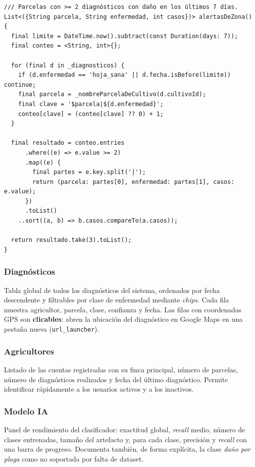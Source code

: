 \documentclass[12pt,a4paper]{article}
\begin{document}
\begin{lstlisting}[caption={Detección de focos de propagación (alertas de zona)}, label={lst:alertas}]
/// Parcelas con >= 2 diagnósticos con daño en los últimos 7 días.
List<({String parcela, String enfermedad, int casos})> alertasDeZona() {
  final limite = DateTime.now().subtract(const Duration(days: 7));
  final conteo = <String, int>{};

  for (final d in _diagnosticos) {
    if (d.enfermedad == 'hoja_sana' || d.fecha.isBefore(limite)) continue;
    final parcela = _nombreParcelaDeCultivo(d.cultivoId);
    final clave = '$parcela|${d.enfermedad}';
    conteo[clave] = (conteo[clave] ?? 0) + 1;
  }

  final resultado = conteo.entries
      .where((e) => e.value >= 2)
      .map((e) {
        final partes = e.key.split('|');
        return (parcela: partes[0], enfermedad: partes[1], casos: e.value);
      })
      .toList()
    ..sort((a, b) => b.casos.compareTo(a.casos));

  return resultado.take(3).toList();
}
\end{lstlisting}

\subsubsection{Diagnósticos}

Tabla global de todos los diagnósticos del sistema, ordenados por fecha
descendente y filtrables por clase de enfermedad mediante \textit{chips}. Cada
fila muestra agricultor, parcela, clase, confianza y fecha. Las filas con
coordenadas GPS son \textbf{clicables}: abren la ubicación del diagnóstico en
Google Maps en una pestaña nueva (\texttt{url\_launcher}).

\subsubsection{Agricultores}

Listado de las cuentas registradas con su finca principal, número de parcelas,
número de diagnósticos realizados y fecha del último diagnóstico. Permite
identificar rápidamente a los usuarios activos y a los inactivos.

\subsubsection{Modelo IA}

Panel de rendimiento del clasificador: exactitud global, \textit{recall} medio,
número de clases entrenadas, tamaño del artefacto y, para cada clase, precisión
y \textit{recall} con una barra de progreso. Documenta también, de forma
explícita, la clase \textit{daño por plaga} como no soportada por falta de
dataset.
\end{document}
